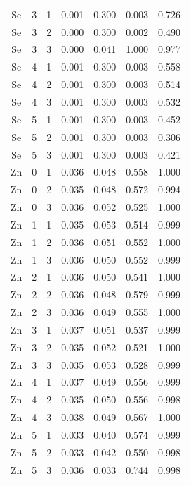 \documentclass[ms, hidelinks]{uncgdissertationexp3}
\theoremstyle{plain}
\theoremstyle{definition}
\theoremstyle{remark}
\begin{document}
\begin{longtable}{ccccccc}
  Se & 3 & 1 & 0.001 & 0.300 & 0.003 & 0.726\\
  \rowcolor{gray!6}  Se & 3 & 2 & 0.000 & 0.300 & 0.002 & 0.490\\
  Se & 3 & 3 & 0.000 & 0.041 & 1.000 & 0.977\\
  \rowcolor{gray!6}  Se & 4 & 1 & 0.001 & 0.300 & 0.003 & 0.558\\
  Se & 4 & 2 & 0.001 & 0.300 & 0.003 & 0.514\\
  \rowcolor{gray!6}  Se & 4 & 3 & 0.001 & 0.300 & 0.003 & 0.532\\
  Se & 5 & 1 & 0.001 & 0.300 & 0.003 & 0.452\\
  \rowcolor{gray!6}  Se & 5 & 2 & 0.001 & 0.300 & 0.003 & 0.306\\
  Se & 5 & 3 & 0.001 & 0.300 & 0.003 & 0.421\\
  \rowcolor{gray!6}  Zn & 0 & 1 & 0.036 & 0.048 & 0.558 & 1.000\\
  Zn & 0 & 2 & 0.035 & 0.048 & 0.572 & 0.994\\
  \rowcolor{gray!6}  Zn & 0 & 3 & 0.036 & 0.052 & 0.525 & 1.000\\
  Zn & 1 & 1 & 0.035 & 0.053 & 0.514 & 0.999\\
  \rowcolor{gray!6}  Zn & 1 & 2 & 0.036 & 0.051 & 0.552 & 1.000\\
  Zn & 1 & 3 & 0.036 & 0.050 & 0.552 & 0.999\\
  \rowcolor{gray!6}  Zn & 2 & 1 & 0.036 & 0.050 & 0.541 & 1.000\\
  Zn & 2 & 2 & 0.036 & 0.048 & 0.579 & 0.999\\
  \rowcolor{gray!6}  Zn & 2 & 3 & 0.036 & 0.049 & 0.555 & 1.000\\
  Zn & 3 & 1 & 0.037 & 0.051 & 0.537 & 0.999\\
  \rowcolor{gray!6}  Zn & 3 & 2 & 0.035 & 0.052 & 0.521 & 1.000\\
  Zn & 3 & 3 & 0.035 & 0.053 & 0.528 & 0.999\\
  \rowcolor{gray!6}  Zn & 4 & 1 & 0.037 & 0.049 & 0.556 & 0.999\\
  Zn & 4 & 2 & 0.035 & 0.050 & 0.556 & 0.998\\
  \rowcolor{gray!6}  Zn & 4 & 3 & 0.038 & 0.049 & 0.567 & 1.000\\
  Zn & 5 & 1 & 0.033 & 0.040 & 0.574 & 0.999\\
  \rowcolor{gray!6}  Zn & 5 & 2 & 0.033 & 0.042 & 0.550 & 0.998\\
  Zn & 5 & 3 & 0.036 & 0.033 & 0.744 & 0.998\\*
  \end{longtable}
\end{document}
